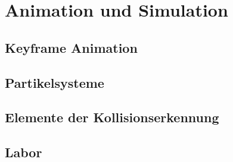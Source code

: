 \section{Animation und Simulation}
\subsection{Keyframe Animation}
\subsection{Partikelsysteme}
\subsection{Elemente der Kollisionserkennung}
\subsection{Labor}
